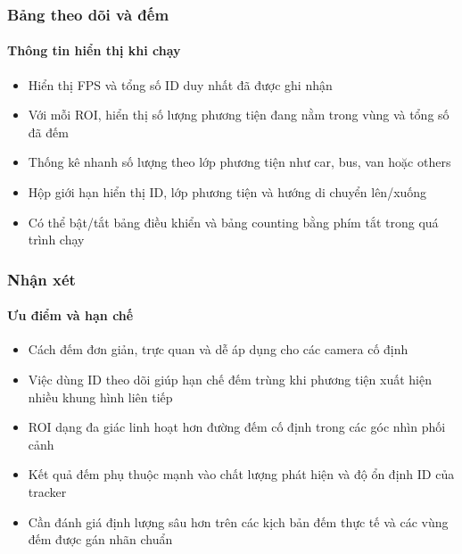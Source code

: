 \begin{frame}
\frametitle{Bảng theo dõi và đếm}
\framesubtitle{Thông tin hiển thị khi chạy}

\begin{itemize}[<+->]
  \item Hiển thị FPS và tổng số ID duy nhất đã được ghi nhận
  \item Với mỗi ROI, hiển thị số lượng phương tiện đang nằm trong vùng và tổng
        số đã đếm
  \item Thống kê nhanh số lượng theo lớp phương tiện như car, bus, van hoặc
        others
  \item Hộp giới hạn hiển thị ID, lớp phương tiện và hướng di chuyển lên/xuống
  \item Có thể bật/tắt bảng điều khiển và bảng counting bằng phím tắt trong
        quá trình chạy
\end{itemize}

\end{frame}

\begin{frame}
\frametitle{Nhận xét}
\framesubtitle{Ưu điểm và hạn chế}

\begin{itemize}[<+->]
  \item Cách đếm đơn giản, trực quan và dễ áp dụng cho các camera cố định
  \item Việc dùng ID theo dõi giúp hạn chế đếm trùng khi phương tiện xuất hiện
        nhiều khung hình liên tiếp
  \item ROI dạng đa giác linh hoạt hơn đường đếm cố định trong các góc nhìn
        phối cảnh
  \item Kết quả đếm phụ thuộc mạnh vào chất lượng phát hiện và độ ổn định ID
        của tracker
  \item Cần đánh giá định lượng sâu hơn trên các kịch bản đếm thực tế và các
        vùng đếm được gán nhãn chuẩn
\end{itemize}

\end{frame}
